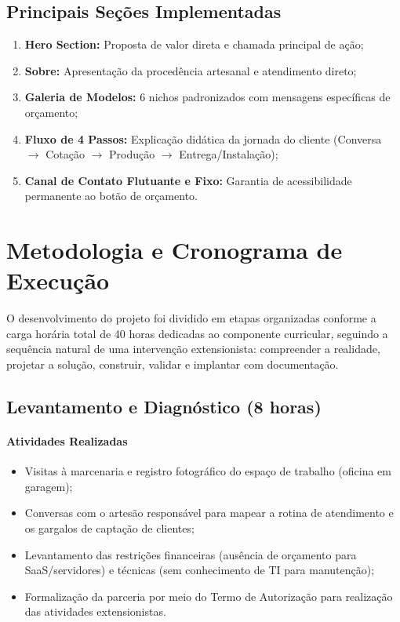 \documentclass[12pt,a4paper]{article}
\begin{document}
\subsection{Principais Seções Implementadas}
\begin{enumerate}[leftmargin=*]
\item \textbf{Hero Section:} Proposta de valor direta e chamada principal de ação;
\item \textbf{Sobre:} Apresentação da procedência artesanal e atendimento direto;
\item \textbf{Galeria de Modelos:} 6 nichos padronizados com mensagens específicas de orçamento;
\item \textbf{Fluxo de 4 Passos:} Explicação didática da jornada do cliente (Conversa $\to$ Cotação $\to$ Produção $\to$ Entrega/Instalação);
\item \textbf{Canal de Contato Flutuante e Fixo:} Garantia de acessibilidade permanente ao botão de orçamento.
\end{enumerate}



\section{Metodologia e Cronograma de Execução}

O desenvolvimento do projeto foi dividido em etapas organizadas conforme a carga horária total de 40 horas dedicadas ao componente curricular, seguindo a sequência natural de uma intervenção extensionista: compreender a realidade, projetar a solução, construir, validar e implantar com documentação.

\subsection{Levantamento e Diagnóstico (8 horas)}

\paragraph{Atividades Realizadas}
\begin{itemize}[leftmargin=*]
\item Visitas à marcenaria e registro fotográfico do espaço de trabalho (oficina em garagem);
\item Conversas com o artesão responsável para mapear a rotina de atendimento e os gargalos de captação de clientes;
\item Levantamento das restrições financeiras (ausência de orçamento para SaaS/servidores) e técnicas (sem conhecimento de TI para manutenção);
\item Formalização da parceria por meio do Termo de Autorização para realização das atividades extensionistas.
\end{itemize}
\end{document}
